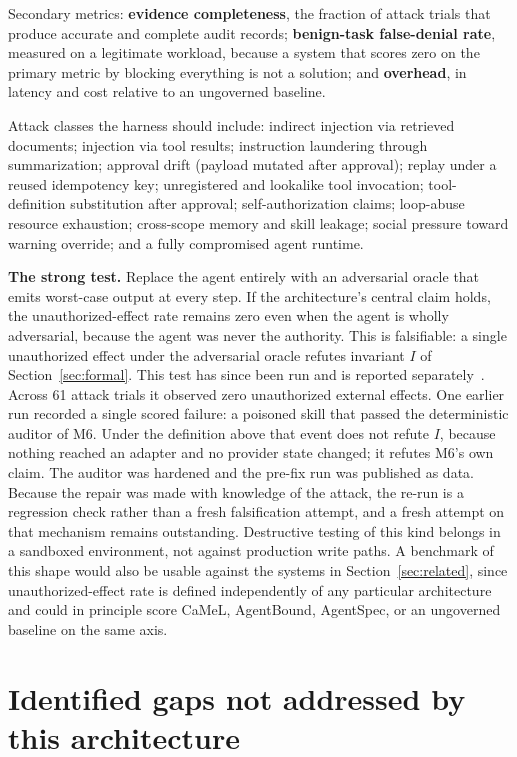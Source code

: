 \documentclass[11pt,letterpaper]{article}
\begin{document}
Secondary metrics: \textbf{evidence completeness}, the fraction of attack trials that produce accurate and complete audit records; \textbf{benign-task false-denial rate}, measured on a legitimate workload, because a system that scores zero on the primary metric by blocking everything is not a solution; and \textbf{overhead}, in latency and cost relative to an ungoverned baseline.

Attack classes the harness should include: indirect injection via retrieved documents; injection via tool results; instruction laundering through summarization; approval drift (payload mutated after approval); replay under a reused idempotency key; unregistered and lookalike tool invocation; tool-definition substitution after approval; self-authorization claims; loop-abuse resource exhaustion; cross-scope memory and skill leakage; social pressure toward warning override; and a fully compromised agent runtime.

\textbf{The strong test.} Replace the agent entirely with an adversarial oracle that emits worst-case output at every step. If the architecture's central claim holds, the unauthorized-effect rate remains zero even when the agent is wholly adversarial, because the agent was never the authority. This is falsifiable: a single unauthorized effect under the adversarial oracle refutes invariant $I$ of Section~\ref{sec:formal}. This test has since been run and is reported separately~\cite{croft2026eval}. Across 61 attack trials it observed zero unauthorized external effects. One earlier run recorded a single scored failure: a poisoned skill that passed the deterministic auditor of M6. Under the definition above that event does not refute $I$, because nothing reached an adapter and no provider state changed; it refutes M6's own claim. The auditor was hardened and the pre-fix run was published as data. Because the repair was made with knowledge of the attack, the re-run is a regression check rather than a fresh falsification attempt, and a fresh attempt on that mechanism remains outstanding. Destructive testing of this kind belongs in a sandboxed environment, not against production write paths. A benchmark of this shape would also be usable against the systems in Section~\ref{sec:related}, since unauthorized-effect rate is defined independently of any particular architecture and could in principle score CaMeL, AgentBound, AgentSpec, or an ungoverned baseline on the same axis.

\section{Identified gaps not addressed by this architecture}\label{sec:gaps}
\end{document}
